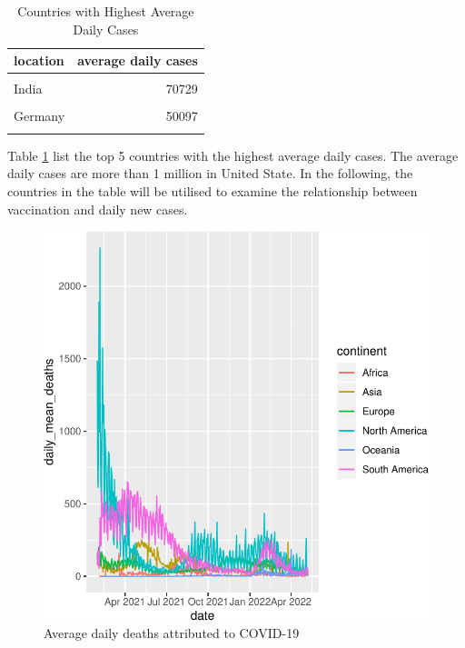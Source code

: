 \documentclass[11pt,a4paper,]{article}
\begin{document}
\begin{table}[!h]

\caption{\label{tab:Table1}Countries with Highest Average Daily Cases}
\centering
\begin{tabular}[t]{l|r}
\hline
location & average daily cases\\
\hline
\cellcolor{gray!6}{United States} & \cellcolor{gray!6}{120485}\\
\hline
India & 70729\\
\hline
\cellcolor{gray!6}{France} & \cellcolor{gray!6}{56649}\\
\hline
Germany & 50097\\
\hline
\cellcolor{gray!6}{Brazil} & \cellcolor{gray!6}{46861}\\
\hline
\end{tabular}
\end{table}

Table \ref{tab:Table1} list the top 5 countries with the highest average daily cases. The average daily cases are more than 1 million in United State.
In the following, the countries in the table will be utilised to examine the relationship between vaccination and daily new cases.

\begin{figure}

{\centering \includegraphics{report_files/figure-latex/Figure2-1} 

}

\caption{Average daily deaths attributed to COVID-19}\label{fig:Figure2}
\end{figure}
\end{document}
